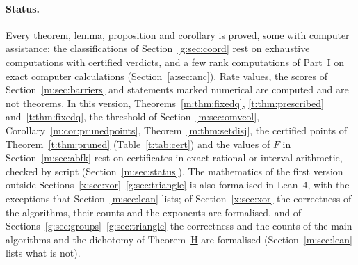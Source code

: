 \documentclass[11pt]{article}
\theoremstyle{definition}
\theoremstyle{remark}
\begin{document}
\paragraph{Status.} Every theorem, lemma, proposition and corollary is proved, some with computer assistance: the classifications of Section~\ref{g:sec:coord} rest on exhaustive computations with certified verdicts, and a few rank computations of Part~\hyperref[m:partI]{I} on exact computer calculations (Section~\ref{a:sec:anc}). Rate values, the scores of Section~\ref{m:sec:barriers} and statements marked numerical are computed and are not theorems.
In this version, Theorems~\ref{m:thm:fixedq}, \ref{t:thm:prescribed} and~\ref{t:thm:fixedq}, the threshold of Section~\ref{m:sec:omvcol}, Corollary~\ref{m:cor:prunedpoints}, Theorem~\ref{m:thm:setdisj}, the certified points of Theorem~\ref{t:thm:pruned} (Table~\ref{t:tab:cert}) and the values of $F$ in Section~\ref{m:sec:abfk} rest on certificates in exact rational or interval arithmetic, checked by script (Section~\ref{m:sec:status}). The mathematics of the first version outside Sections~\ref{x:sec:xor}--\ref{g:sec:triangle} is also formalised in Lean~4, with the exceptions that Section~\ref{m:sec:lean} lists; of Section~\ref{x:sec:xor} the correctness of the algorithms, their counts and the exponents are formalised, and of Sections~\ref{g:sec:groups}--\ref{g:sec:triangle} the correctness and the counts of the main algorithms and the dichotomy of Theorem~\hyperref[m:introH]{H} are formalised (Section~\ref{m:sec:lean} lists what is not).
\end{document}
